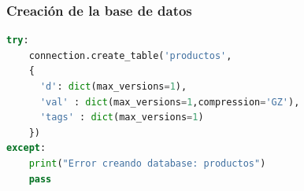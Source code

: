 \documentclass[14pt]{beamer}
\begin{document}
\begin{frame}
  \frametitle{Creación de la base de datos}
\begin{lstlisting}[language=python]
try:
    connection.create_table('productos',
    {
      'd': dict(max_versions=1),
      'val' : dict(max_versions=1,compression='GZ'),
      'tags' : dict(max_versions=1)
    })
except:
    print("Error creando database: productos")
    pass
\end{lstlisting}
\end{frame}



\end{document}
